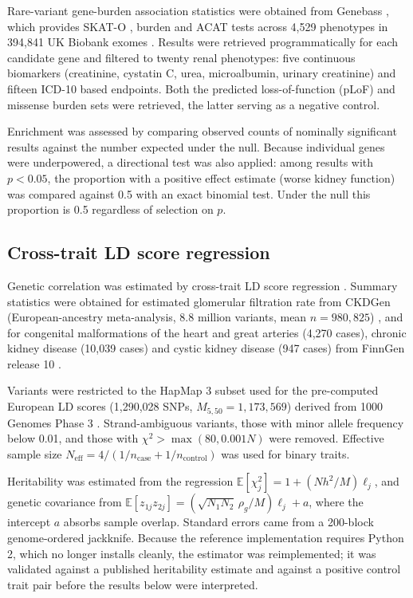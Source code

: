 \documentclass[11pt,a4paper]{article}
\begin{document}
Rare-variant gene-burden association statistics were obtained from Genebass
\cite{karczewski2022}, which provides SKAT-O \cite{lee2014}, burden and ACAT
\cite{liu2019} tests across 4,529 phenotypes in 394,841 UK Biobank exomes
\cite{bycroft2018,szustakowski2021}. Results were retrieved programmatically for each
candidate gene and filtered to twenty renal phenotypes: five continuous biomarkers
(creatinine, cystatin C, urea, microalbumin, urinary creatinine) and fifteen ICD-10 based
endpoints. Both the predicted loss-of-function (pLoF) and missense burden sets were
retrieved, the latter serving as a negative control.

Enrichment was assessed by comparing observed counts of nominally significant results against
the number expected under the null. Because individual genes were underpowered, a
directional test was also applied: among results with $p < 0.05$, the proportion with a
positive effect estimate (worse kidney function) was compared against 0.5 with an exact
binomial test. Under the null this proportion is 0.5 regardless of selection on $p$.

\subsection{Cross-trait LD score regression}

Genetic correlation was estimated by cross-trait LD score regression
\cite{bulik2015a,bulik2015b}. Summary statistics were obtained for estimated glomerular
filtration rate from CKDGen (European-ancestry meta-analysis, 8.8 million variants,
mean $n = 980{,}825$) \cite{stanzick2021}, and for congenital malformations of the heart and
great arteries (4,270 cases), chronic kidney disease (10,039 cases) and cystic kidney disease
(947 cases) from FinnGen release 10 \cite{kurki2023}.

Variants were restricted to the HapMap 3 subset used for the pre-computed European LD scores
(1,290,028 SNPs, $M_{5,50} = 1{,}173{,}569$) derived from 1000 Genomes Phase 3
\cite{1000g2015}. Strand-ambiguous variants, those with minor allele frequency below 0.01,
and those with $\chi^2 > \max(80, 0.001N)$ were removed. Effective sample size
$N_{\text{eff}} = 4/(1/n_{\text{case}} + 1/n_{\text{control}})$ was used for binary traits.

Heritability was estimated from the regression
$\mathbb{E}[\chi^2_j] = 1 + (Nh^2/M)\ell_j$, and genetic covariance from
$\mathbb{E}[z_{1j}z_{2j}] = (\sqrt{N_1N_2}\,\rho_g/M)\ell_j + a$, where the intercept $a$
absorbs sample overlap. Standard errors came from a 200-block genome-ordered jackknife.
Because the reference implementation requires Python 2, which no longer installs cleanly, the
estimator was reimplemented; it was validated against a published heritability estimate and
against a positive control trait pair before the results below were interpreted.
\end{document}
